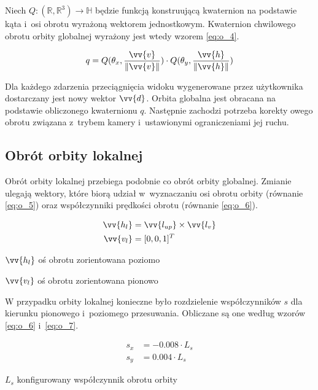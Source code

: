 Niech $Q: (\mathbb{R}, \mathbb{R}^3) \to \mathbb{H}$ będzie funkcją konstruującą kwaternion na podstawie kąta i~osi obrotu wyrażoną wektorem jednostkowym. Kwaternion chwilowego obrotu orbity globalnej wyrażony jest wtedy wzorem \ref{eq:o_4}.

\begin{samepage}
    \begin{equation}
        \label{eq:o_4}
        q = Q(\theta_x, \frac{\vv{v}}{\Vert\vv{v}\Vert}) \cdot Q(\theta_y, \frac{\vv{h}}{\Vert\vv{h}\Vert})
    \end{equation}
    \vspace{\baselineskip}
\end{samepage}

Dla każdego zdarzenia przeciągnięcia widoku wygenerowane przez użytkownika dostarczany jest nowy wektor $\vv{d}$. Orbita globalna jest obracana na podstawie obliczonego kwaternionu $q$. Następnie zachodzi potrzeba korekty owego obrotu związana z~trybem kamery i~ustawionymi ograniczeniami jej ruchu. 

\subsection{Obrót orbity lokalnej}
Obrót orbity lokalnej przebiega podobnie co obrót orbity globalnej. Zmianie ulegają wektory, które biorą udział w~wyznaczaniu osi obrotu orbity (równanie \ref{eq:o_5}) oraz współczynniki prędkości obrotu (równanie \ref{eq:o_6}).

\begin{samepage}
    \begin{align}
        \label{eq:o_5}
        \vv{h_l} &= \vv{l_{up}} \times \vv{l_{v}}\\
        \vv{v_l} &= [0, 0, 1]^T
    \end{align}
    \begin{eqexpl}[25mm]
        \item {$\vv{h_l}$} oś obrotu zorientowana poziomo
        \item {$\vv{v_l}$} oś obrotu zorientowana pionowo
    \end{eqexpl}
    \vspace{\baselineskip}
\end{samepage}

W przypadku orbity lokalnej konieczne było rozdzielenie współczynników $s$ dla kierunku pionowego i~poziomego przesuwania. Obliczane są one według wzorów \ref{eq:o_6} i~\ref{eq:o_7}.

\begin{samepage}
    \begin{align}
        \label{eq:o_6}
        s_x &= -0.008 \cdot L_s \\
        \label{eq:o_7}
        s_y &= 0.004 \cdot L_s
    \end{align}
    \begin{eqexpl}[25mm]
        \item {$L_s$} konfigurowany współczynnik obrotu orbity 
    \end{eqexpl}
    \vspace{\baselineskip}
\end{samepage}

